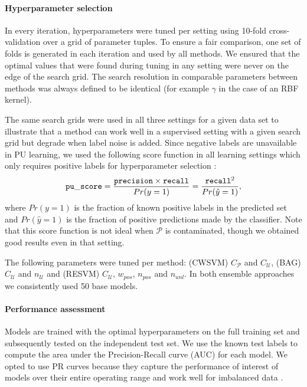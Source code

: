 \documentclass[preprint,elsarticle-num,12pt]{elsarticle}
\begin{document}


\paragraph{Hyperparameter selection}
In every iteration, hyperparameters were tuned per setting using 10-fold cross-validation over a grid of parameter tuples. To ensure a fair comparison, one set of folds is generated in each iteration and used by all methods. We ensured that the optimal values that were found during tuning in any setting were never on the edge of the search grid. The search resolution in comparable parameters between methods was always defined to be identical (for example $\gamma$ in the case of an RBF kernel). 

The same search grids were used in all three settings for a given data set to illustrate that a method can work well in a supervised setting with a given search grid but degrade when label noise is added. Since negative labels are unavailable in PU learning, we used the following score function in all learning settings which only requires positive labels for hyperparameter selection \citep{Lee03learningwith}:
\begin{equation}
{\tt pu\_score} = \frac{\mathtt{precision}\times \mathtt{recall}}{Pr(y=1)} =
\frac{\mathtt{recall}^2}{Pr(\hat{y}=1)},
\label{puscore}
\end{equation}
where $Pr(y=1)$ is the fraction of known positive labels in the predicted set and $Pr(\hat{y}=1)$ is the fraction of positive predictions made by the classifier. Note that this score function is not ideal when $\mathcal{P}$ is contaminated, though we obtained good results even in that setting.

The following parameters were tuned per method: (CWSVM) $C_{\mathcal{P}}$ and $C_{\mathcal{U}}$, (BAG) $C_{\mathcal{U}}$ and $n_{\mathcal{U}}$ and (RESVM) $C_{\mathcal{U}}$, $w_{pos}$, $n_{pos}$ and $n_{unl}$. In both ensemble approaches we consistently used 50 base models.


\paragraph{Performance assessment} Models are trained with the optimal hyperparameters on the full training set and subsequently tested on the independent test set. We use the known test labels to compute the area under the Precision-Recall curve (AUC) for each model. We opted to use PR curves because they capture the performance of interest of models over their entire operating range and work well for imbalanced data \citep{Davis:2006:RPR:1143844.1143874}. 
\end{document}
